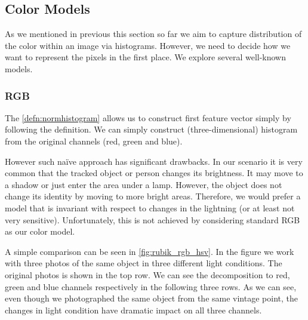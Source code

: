 
\subsection{Color Models}

As we mentioned in previous this section so far we aim to capture distribution
of the color within an image via histograms. However, we need to decide how
we want to represent the pixels in the first place. We explore several
well-known models.

\subsubsection{RGB}

The \autoref{defn:normhistogram} allows us to construct first feature vector
simply by following the definition. We can simply construct (three-dimensional)
histogram from the original channels (red, green and blue).

However such naïve approach has significant drawbacks. In our scenario it is
very common that the tracked object or person changes its brightness. It may
move to a shadow or just enter the area under a lamp. However, the object
does not change its identity by moving to more bright areas. Therefore, we
would prefer a model that is invariant with respect to changes in the
lightning (or at least not very sensitive). Unfortunately, this is not
achieved by considering standard RGB as our color model.

A simple comparison can be seen in \autoref{fig:rubik_rgb_hsv}. In the figure we
work with three photos of the same object in three different light conditions.
The original photos is shown in the top row. We can see the decomposition to
red, green and blue channels respectively in the following three rows. As we
can see, even though we photographed the same object from the same vintage
point, the changes in light condition have dramatic impact on all three
channels.

